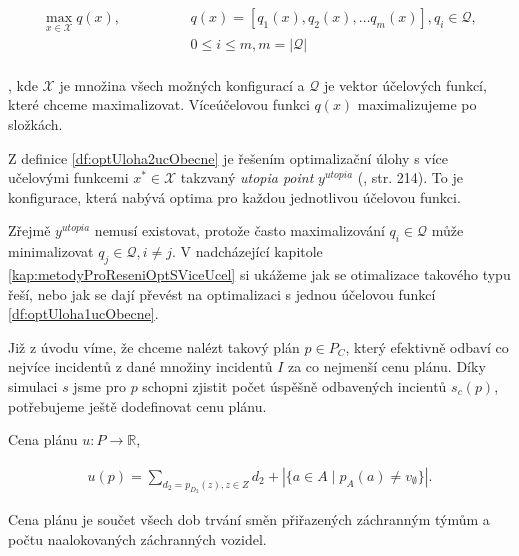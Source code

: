 \begin{definice}\label{df:optUloha2ucObecne}
  \begin{align*}
    \max_{x \in \mathcal{X}} q(x), \hspace{50pt} &q(x) = [q_1(x), q_2(x), \dots q_{m}(x)], q_i \in \mathcal{Q}, \\
                                                 &0 \leq i \leq m, m = |\mathcal{Q}| 
  \end{align*}
  \\
  , kde $\mathcal{X}$ je množina všech možných konfigurací a $\mathcal{Q}$ je vektor účelových funkcí, které chceme maximalizovat.
  Víceúčelovou funkci $q(x)$ maximalizujeme po složkách.
\end{definice}

\begin{definice}
  Z definice \ref{df:optUloha2ucObecne} je řešením optimalizační úlohy s více učelovými funkcemi 
  $x^* \in \mathcal{X}$ takzvaný \textit{utopia point} $y^{utopia}$ (\citet{AlgOptBook}, str. 214).
  To je konfigurace, která nabývá optima pro každou jednotlivou účelovou funkci.
\end{definice}

Zřejmě $y^{utopia}$ nemusí existovat, protože často maximalizování $q_i \in \mathcal{Q}$ může minimalizovat $q_j \in \mathcal{Q}, i \neq j$.
V nadcházející kapitole \ref{kap:metodyProReseniOptSViceUcel} si ukážeme jak se otimalizace takového typu řeší, nebo jak se dají převést na 
optimalizaci s jednou účelovou funkcí \ref{df:optUloha1ucObecne}.

Již z úvodu víme, že chceme nalézt takový plán $p \in P_C$, který efektivně odbaví co nejvíce incidentů z dané množiny incidentů $I$ za co nejmenší cenu plánu.
Díky simulaci $s$ jsme pro $p$ schopni zjistit počet úspěšně odbavených incientů $s_c(p)$, potřebujeme ještě dodefinovat cenu plánu.

\begin{definice}\label{df:cenaPlanu}
  Cena plánu $u \colon P \rightarrow \mathbb{R}$,

  \begin{align*}
    u(p) = \sum_{d_2 = p_{D_2}(z), z \in Z} d_2 + |\{ a \in A \mid p_{A}(a) \neq v_{\emptyset} \}|.
  \end{align*}

  Cena plánu je součet všech dob trvání směn přiřazených záchranným týmům a počtu naalokovaných záchranných vozidel.
\end{definice}

